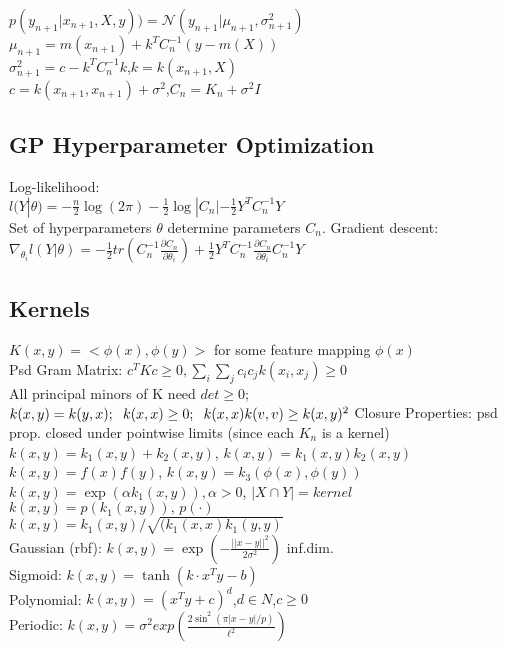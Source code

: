 $p(y_{n+1}|x_{n+1}, X, y)) = \mathcal{N}(y_{n+1} | \mu_{n+1}, \sigma^2_{n+1})$	\\
$\mu_{n+1} = m(x_{n+1})+k^T C^{-1}_n (y\!-\!m(X))$ \\
$\sigma^2_{n+1} = c - k^T C^{-1}_n k$,$k = k(x_{n+1}, X)$ \\
$c = k(x_{n+1},x_{n+1})\!+\!\sigma^2$,$C_n = K_n + \sigma^2 I$

\subsection*{GP Hyperparameter Optimization}
Log-likelihood:\\
$l(Y|\theta) = -\frac{n}{2} \log(2\pi) - \frac{1}{2} \log |C_n| - \frac{1}{2} Y^T C_n^{-1}Y$\\
Set of hyperparameters $\theta$ determine parameters $C_n$. Gradient descent: $\nabla_{\theta_i}l(Y|\theta) = -\frac{1}{2}tr(C_n^{-1} \frac{\partial C_n}{\partial \theta_i}) + \frac{1}{2} Y^T C_n^{-1} \frac{\partial C_n}{\partial \theta_i} C_n^{-1} Y$

\subsection*{Kernels}
	$K(x, y) = <\phi(x), \phi(y)>$ for some feature mapping $\phi(x)$\\
    Psd Gram Matrix: $c^TKc \geq 0, \sum_i\sum_jc_ic_jk(x_i,x_j)\geq 0$\\
    All principal minors of K need $det \geq 0$;\newline
	$k(x, y) = k(y, x) ;\hspace{2mm} k(x,x) \geq 0;\hspace{2mm} k(x,x)k(v,v) \geq k(x,y)^2$ 
	Closure Properties: {\tiny psd prop. closed under pointwise limits (since each $K_n$ is a kernel)} \\
    $k(x,y) = k_1(x,y) + k_2(x,y)$, $k(x,y) = k_1(x,y)k_2(x,y)$\\
	$k(x,y) = f(x)f(y)$, $k(x,y) = k_3(\phi(x),\phi(y))$\\
    $k(x,y) = \exp(\alpha k_1(x,y)), \alpha > 0$, $|X \cap Y| = kernel$\\
	$k(x,y) = p(k_1(x,y)), \, p(\cdot)$ {\tiny{}}\\   
	$k(x,y)=k_1(x,y)/ \sqrt{(k_1(x,x) k_1(y,y)}$\\
	Gaussian (rbf): $k(x,y) = \exp( -\tfrac{||x-y||^2}{2\sigma^2})$ {\tiny inf.dim.}\\
	Sigmoid: $k(x,y) = \tanh(k\cdot x^Ty - b)$ {\tiny{}} \\
	Polynomial: $k(x,y) {=} (x^Ty {+} c)^d$,$d\in N$,$c\geq0$ \\
	Periodic: $k(x,y) = \sigma ^2 exp(\frac{2\sin ^2 (\pi |x-y|/p)}{\ell ^2})$


